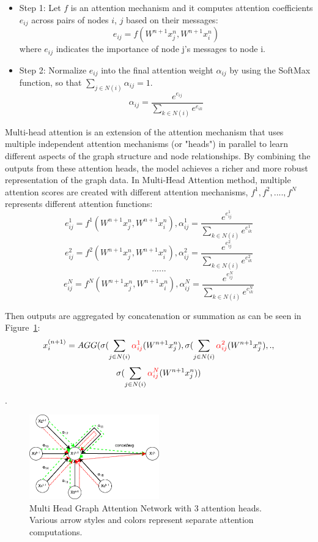 \begin{itemize}
  \item Step 1: Let $f$ is an attention mechanism and it computes attention coefficients $e_{ij}$ across pairs of nodes $i$, $j$ based on their messages: $$ e_{ij} = f(W^{n+1}x_j^n, W^{n+1}x_i^n) $$ where $e_{ij}$ indicates the importance of node j’s messages to node i.
  \item Step 2: Normalize $e_{ij}$ into the final attention weight $\alpha_{ij}$ by using the SoftMax function, so that $\sum_{j \in N(i)} \alpha_{ij} = 1 $. $$ \alpha_{ij} = \frac{e^{e_{ij}}}{\sum_{k \in N(i)} e^{e_{ik}}} $$
\end{itemize}


Multi-head attention is an extension of the attention mechanism that uses multiple independent attention mechanisms (or "heads") in parallel to learn different aspects of the graph structure and node relationships.
By combining the outputs from these attention heads, the model achieves a richer and more robust representation of the graph data.
In Multi-Head Attention method, multiple attention scores are created with different attention mechanisms, $ f^1, f^2, .... , f^N $ represents different attention functions: $$ e_{ij}^1 = f^1(W^{n+1}x_j^n, W^{n+1}x_i^n), \alpha_{ij}^1 = \frac{e^{e_{ij}^1}}{\sum_{k \in N(i)} e^{e_{ik}^1}} $$ $$ e_{ij}^2 = f^2(W^{n+1}x_j^n, W^{n+1}x_i^n), \alpha_{ij}^2 = \frac{e^{e_{ij}^2}}{\sum_{k \in N(i)} e^{e_{ik}^2}} $$ $$ ...... $$ $$ e_{ij}^N = f^N(W^{n+1}x_j^n, W^{n+1}x_i^n), \alpha_{ij}^N = \frac{e^{e_{ij}^N}}{\sum_{k \in N(i)} e^{e_{ik}^N}} $$


Then outputs are aggregated by concatenation or summation as can be seen in Figure~\ref{fig:mh-gat}: $$ x_i^{(n+1)} = AGG(\sigma(\sum_{j \in N(i)} \textcolor{red}{\alpha_{ij}^1}(W^{n+1}x_j^n), \sigma(\sum_{j \in N(i)} \textcolor{red}{\alpha_{ij}^2}(W^{n+1}x_j^n), . ,$$ $$ \sigma(\sum_{j \in N(i)} \textcolor{red}{\alpha_{ij}^N}(W^{n+1}x_j^n)) $$
.
\begin{figure}[htb!]
    \centering
    \includegraphics[width=0.5\textwidth]{figures/MH GAT.drawio}
    \caption{Multi Head Graph Attention Network with 3 attention heads. Various arrow styles and colors represent separate attention computations.}
    \label{fig:mh-gat}
\end{figure}


